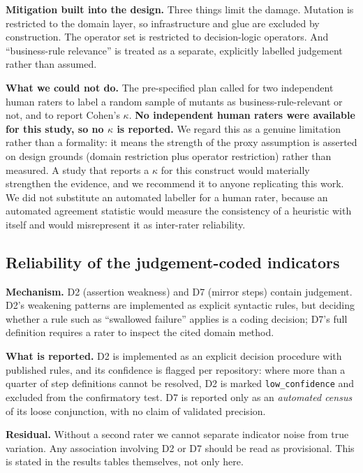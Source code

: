 \textbf{Mitigation built into the design.} Three things limit the damage. Mutation is restricted to
the domain layer, so infrastructure and glue are excluded by construction. The operator set is
restricted to decision-logic operators. And ``business-rule relevance'' is treated as a separate,
explicitly labelled judgement rather than assumed.

\textbf{What we could not do.} The pre-specified plan called for two independent human raters to
label a random sample of mutants as business-rule-relevant or not, and to report Cohen's $\kappa$.
\textbf{No independent human raters were available for this study, so no $\kappa$ is reported.} We
regard this as a genuine limitation rather than a formality: it means the strength of the proxy
assumption is asserted on design grounds (domain restriction plus operator restriction) rather than
measured. A study that reports a $\kappa$ for this construct would materially strengthen the
evidence, and we recommend it to anyone replicating this work. We did not substitute an automated
labeller for a human rater, because an automated agreement statistic would measure the consistency of
a heuristic with itself and would misrepresent it as inter-rater reliability.

\subsection{Reliability of the judgement-coded indicators}

\textbf{Mechanism.} D2 (assertion weakness) and D7 (mirror steps) contain judgement. D2's weakening
patterns are implemented as explicit syntactic rules, but deciding whether a rule such as ``swallowed
failure'' applies is a coding decision; D7's full definition requires a rater to inspect the cited
domain method.

\textbf{What is reported.} D2 is implemented as an explicit decision procedure with published rules,
and its confidence is flagged per repository: where more than a quarter of step definitions cannot be
resolved, D2 is marked \texttt{low\_confidence} and excluded from the confirmatory test. D7 is
reported only as an \emph{automated census} of its loose conjunction, with no claim of validated
precision.

\textbf{Residual.} Without a second rater we cannot separate indicator noise from true variation. Any
association involving D2 or D7 should be read as provisional. This is stated in the results tables
themselves, not only here.

